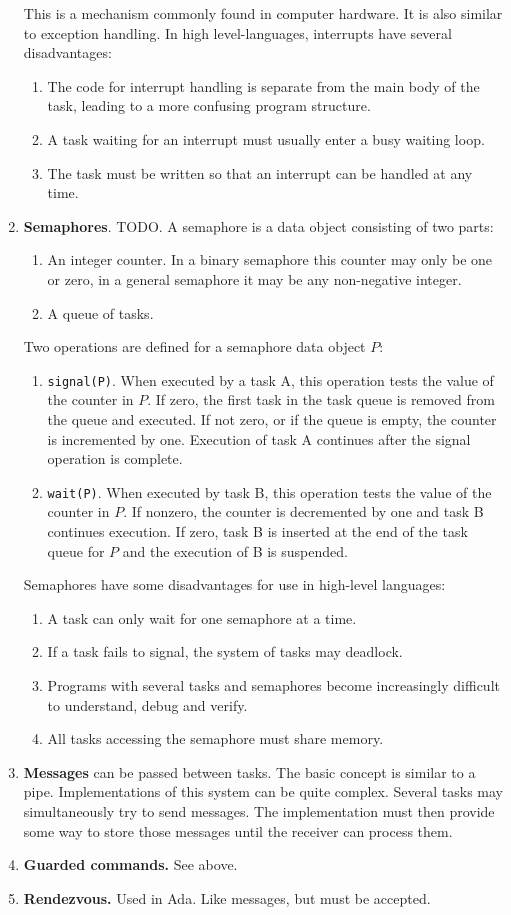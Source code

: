 \begin{enumerate}
This is a mechanism commonly found in computer hardware. It is also similar to exception handling. In high level-languages, interrupts have several disadvantages:
\begin{enumerate}
\item The code for interrupt handling is separate from the main body of the task, leading to a more confusing program structure.
\item A task waiting for an interrupt must usually enter a busy waiting loop.
\item The task must be written so that an interrupt can be handled at any time.
\end{enumerate}
\item \textbf{Semaphores}. TODO. A semaphore is a data object consisting of two parts:
\begin{enumerate}
\item An integer counter. In a binary semaphore this counter may only be one or zero, in a general semaphore it may be any non-negative integer.
\item A queue of tasks.
\end{enumerate}
Two operations are defined for a semaphore data object $P$:
\begin{enumerate}
\item \texttt{signal(P)}. When executed by a task A, this operation tests the value of the counter in $P$. If zero, the first task in the task queue is removed from the queue and executed. If not zero, or if the queue is empty, the counter is incremented by one. Execution of task A continues after the signal operation is complete.
\item \texttt{wait(P)}. When executed by task B, this operation tests the value of the counter in $P$. If nonzero, the counter is decremented by one and task B continues execution. If zero, task B is inserted at the end of the task queue for $P$ and the execution of B is suspended.
\end{enumerate}
Semaphores have some disadvantages for use in high-level languages:
\begin{enumerate}
\item A task can only wait for one semaphore at a time.
\item If a task fails to signal, the system of tasks may deadlock.
\item Programs with several tasks and semaphores become increasingly difficult to understand, debug and verify.
\item All tasks accessing the semaphore must share memory.
\end{enumerate}
\item \textbf{Messages} can be passed between tasks. The basic concept is similar to a pipe. Implementations of this system can be quite complex. Several tasks may simultaneously try to send messages. The implementation must then provide some way to store those messages until the receiver can process them.
\item \textbf{Guarded commands.} See above.
\item \textbf{Rendezvous.} Used in Ada. Like messages, but must be accepted.
\end{enumerate} 

